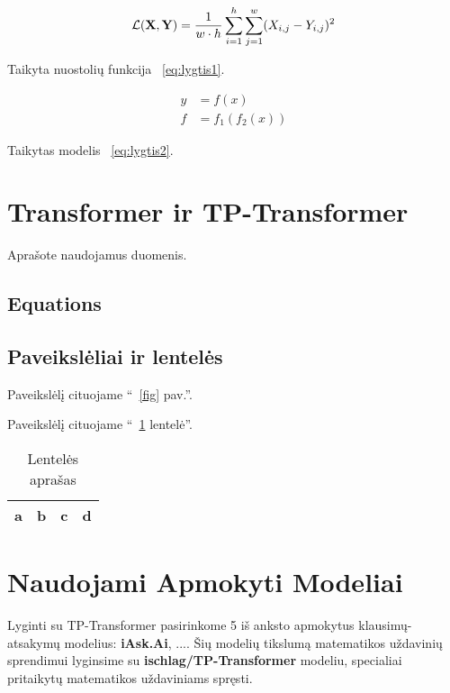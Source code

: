 \documentclass[conference]{IEEEtran}
\begin{document}
\begin{equation}
\mathcal{L}({\bf X}, {\bf Y}) = \frac{1}{w \cdot h} \sum_{i=1}^h \sum_{j=1}^w (X_{i, j} - Y_{i, j})^2
\label{eq:lygtis1}
\end{equation}

Taikyta nuostolių funkcija ~\eqref{eq:lygtis1}.

\begin{align}
y & = f(x) \nonumber \\
f & = f_1(f_2(x))
\label{eq:lygtis2}
\end{align}

Taikytas modelis ~\eqref{eq:lygtis2}.


\section{Transformer ir TP-Transformer}
Aprašote naudojamus duomenis.

\subsection{Equations}



\subsection{Paveikslėliai ir lentelės}

Paveikslėlį cituojame ``~\ref{fig} pav.''.

Paveikslėlį cituojame ``~\ref{tab1} lentelė''.

\begin{table}[htbp]
\caption{Lentelės aprašas}
\begin{center}
\begin{tabular}{|c|c|c|c|}
\hline
a & b & c &  d \\
\hline
\end{tabular}
\label{tab1}
\end{center}
\end{table}



\section{Naudojami Apmokyti Modeliai}
Lyginti su TP-Transformer pasirinkome 5 iš anksto apmokytus klausimų-atsakymų modelius: \textbf{
iAsk.Ai}, .... Šių modelių tikslumą matematikos uždavinių sprendimui lyginsime su \textbf{ischlag/TP-Transformer} modeliu,
specialiai pritaikytų matematikos uždaviniams spręsti.
\end{document}
